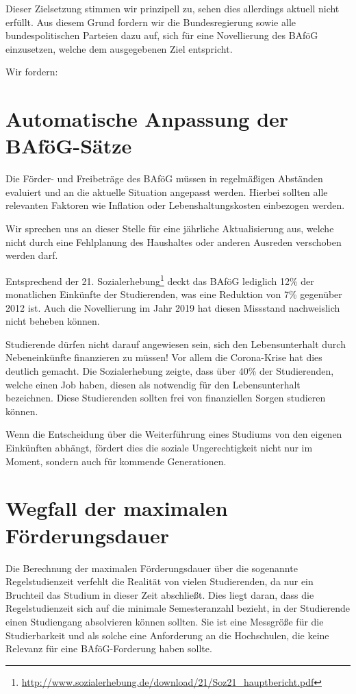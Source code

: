 \documentclass[DIV=calc]{scrartcl}
\begin{document}
Dieser Zielsetzung stimmen wir prinzipell zu, sehen dies allerdings aktuell nicht erfüllt. Aus diesem Grund fordern wir die Bundesregierung sowie alle bundespolitischen Parteien dazu auf, sich für eine Novellierung des BAföG einzusetzen, welche dem ausgegebenen Ziel entspricht.

\large{Wir fordern:}

\section{Automatische Anpassung der BAföG-Sätze}

Die Förder- und Freibeträge des BAföG müssen in regelmäßigen Abständen evaluiert und an die aktuelle Situation angepasst werden. Hierbei sollten alle relevanten Faktoren wie Inflation oder Lebenshaltungskosten einbezogen werden.

Wir sprechen uns an dieser Stelle für eine jährliche Aktualisierung aus, welche nicht durch eine Fehlplanung des Haushaltes oder anderen Ausreden verschoben werden darf. 

Entsprechend der 21. Sozialerhebung\footnote{\url{http://www.sozialerhebung.de/download/21/Soz21_hauptbericht.pdf}} deckt das BAföG lediglich 12\% der monatlichen Einkünfte der Studierenden, was eine Reduktion von 7\% gegenüber 2012 ist. Auch die Novellierung im Jahr 2019 hat diesen Missstand nachweislich nicht beheben können.

Studierende dürfen nicht darauf angewiesen sein, sich den Lebensunterhalt durch Nebeneinkünfte finanzieren zu müssen! Vor allem die Corona-Krise hat dies deutlich gemacht. Die Sozialerhebung zeigte, dass über 40\% der Studierenden, welche einen Job haben, diesen als \glqq notwendig für den Lebensunterhalt\grqq{} bezeichnen. Diese Studierenden sollten frei von finanziellen Sorgen studieren können.

Wenn die Entscheidung über die Weiterführung eines Studiums von den eigenen Einkünften abhängt, fördert dies die soziale Ungerechtigkeit nicht nur im Moment, sondern auch für kommende Generationen.

\section{Wegfall der maximalen Förderungsdauer}

Die Berechnung der maximalen Förderungsdauer über die sogenannte Regelstudienzeit verfehlt die Realität von vielen Studierenden, da nur ein Bruchteil das Studium in dieser Zeit abschließt. Dies liegt daran, dass die Regelstudienzeit sich auf die minimale Semesteranzahl bezieht, in der Studierende einen Studiengang absolvieren können sollten. Sie ist eine Messgröße für die Studierbarkeit und als solche eine Anforderung an die Hochschulen, die keine Relevanz für eine BAföG-Forderung haben sollte.
\end{document}
